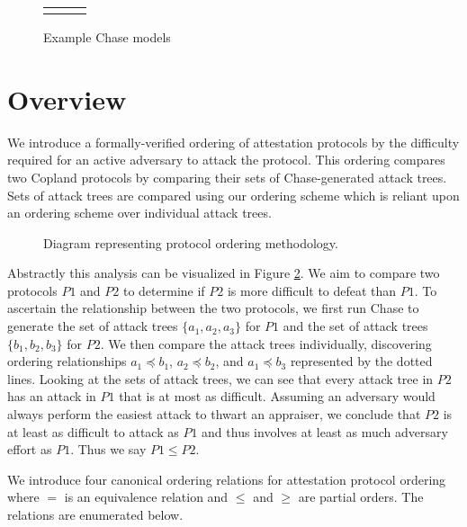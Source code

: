 \documentclass[runningheads]{llncs}
\theoremstyle{definition}
\begin{document}
\begin{figure}[hbtp]
    \centering 
    \begin{tabular}{m{3cm} m{3cm} m{3cm}}
         &  &  
    \end{tabular}
    \caption[Example Chase Models]{Example Chase models}
    \label{fig:chase-ex}
\end{figure}




\section{Overview}
We introduce a formally-verified ordering of attestation protocols by
the difficulty required for an active adversary to attack the
protocol. This ordering compares two Copland protocols by comparing
their sets of Chase-generated attack trees. Sets of attack trees are
compared using our ordering scheme which is reliant upon an ordering
scheme over individual attack trees. 

\begin{figure}[hbtp]
    \centering
    \captionsetup{justification=centering,margin=1cm}
    
    \caption[Protocol ordering abstraction]{Diagram representing protocol ordering methodology. }
    \label{fig:protocol-org-fig}
\end{figure}

Abstractly this analysis can be visualized in Figure
\ref{fig:protocol-org-fig}.  We aim to compare two protocols $P1$ and
$P2$ to determine if $P2$ is more difficult to defeat than $P1$. To
ascertain the relationship between the two protocols, we first run
Chase to generate the set of attack trees $\{ a_1, a_2, a_3\}$ for
$P1$ and the set of attack trees $\{b_1, b_2, b_3\}$ for $P2$. We then
compare the attack trees individually, discovering ordering
relationships $a_1 \preceq b_1$, $a_2 \preceq b_2$, and
$a_1 \preceq b_3$ represented by the dotted lines. Looking at
the sets of attack trees, we can see that every attack tree in $P2$
has an attack in $P1$ that is at most as difficult. Assuming an
adversary would always perform the easiest attack to thwart an
appraiser, we conclude that $P2$ is at least as difficult to attack as
$P1$ and thus involves at least as much adversary effort as $P1$. Thus
we say $P1 \leq P2$.

We introduce four canonical ordering relations for attestation
protocol ordering where $=$ is an equivalence relation and $\le$ and
$\ge$ are partial orders. The relations are enumerated below.
\end{document}
